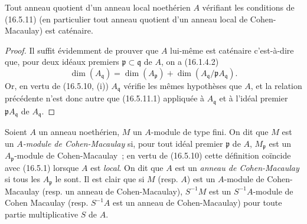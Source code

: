 \begin{corollary}[16.5.12]
\label{0.16.5.12-fr}
Tout anneau quotient d'un anneau local noethérien $A$ vérifiant les conditions
de \textup{(16.5.11)} (en particulier tout anneau quotient d'un anneau local de
Cohen-Macaulay) est caténaire.
\end{corollary}

\begin{proof}
Il suffit évidemment de prouver que $A$ lui-même est caténaire c'est-à-dire
que, pour deux idéaux premiers $\mathfrak{p}\subset\mathfrak{q}$ de $A$, on a
(16.1.4.2)
\[
  \dim(A_{\mathfrak{q}})
  =\dim(A_{\mathfrak{p}})
  +\dim(A_{\mathfrak{q}}/\mathfrak{p}A_{\mathfrak{q}}).
\]
Or, en vertu de (16.5.10, (i)) $A_{\mathfrak{q}}$ vérifie les mêmes
hypothèses que $A$, et la relation précédente n'est donc autre que
(16.5.11.1) appliquée à $A_{\mathfrak{q}}$ et à l'idéal premier
$\mathfrak{p}A_{\mathfrak{q}}$ de $A_{\mathfrak{q}}$.
\end{proof}

\begin{env}[16.5.13]
\label{0.16.5.13-fr}
Soient $A$ un anneau noethérien, $M$ un $A$-module de type fini. On dit que
$M$ est un \emph{$A$-module de Cohen-Macaulay} si, pour tout idéal premier
$\mathfrak{p}$ de $A$, $M_{\mathfrak{p}}$ est un $A_{\mathfrak{p}}$-module
de Cohen-Macaulay~; en vertu de (16.5.10) cette définition coïncide avec
(16.5.1) lorsque $A$ est \emph{local}. On dit que $A$ est un
\emph{anneau de Cohen-Macaulay} si tous les $A_{\mathfrak{p}}$ le sont. Il est
clair que si $M$ (resp. $A$) est un $A$-module de Cohen-Macaulay (resp. un
anneau de Cohen-Macaulay), $S^{-1}M$ est un $S^{-1}A$-module de Cohen Macaulay
(resp. $S^{-1}A$ est un anneau de Cohen-Macaulay) pour toute partie
multiplicative $S$ de $A$.
\end{env}
